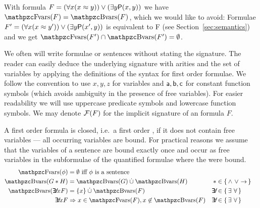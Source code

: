 \begin{example}
	With formula \( F = (\forall x (x\approx y)) \lor (\exists y \mathsf{P}(x,y)) \)
	we have \( \fvar(F) = \bvar(F) \), which we would like to avoid:
	Formulae
	\( F' = (\forall x (x\approx y')) \lor (\exists y \mathsf{P}(x',y)) \)
	is equivalent to F (see Section~\vref{sec:semantics})
	and we get
	\( \fvar(F') \cap \bvar(F') = \emptyset \).
\end{example}

We often will write formulae or sentences
without stating the signature.
The reader can easily deduce the underlying  signature with arities
and the set of variables by applying the definitions of the syntax for first order formulae.
We follow the convention to use \( x,y,z \) for variables
and \( \mathsf{a},\mathsf{b},\mathsf{c} \) for constant function symbols
(which avoids ambiguity in the presence of free variables).
For easier readability we will use uppercase predicate symbols and lowercase function symbols.
We may denote \( \mathcal{F}(F) \) for the implicit signature of an formula \( F \).

\begin{definition}\label{def:fof:closed}\label{def:fof:sentence}
	A first order formula is closed, i.e.~a first order ,
	if it does not contain free variables --- all occurring variables are bound.
	For practical reasons we assume that the variables of a sentence
	are bound exactly once
	and occur as free variables
	in the subformulae of the quantified formulae where the were bound.
	\begin{align*}
		\fvar(\phi) &= \emptyset
		\text{ iff }\phi\text{ is a sentence}
		\\
		\bvar(G * H) &= \bvar(G)\disjointunion\bvar(H)
		&*& \in \{ \, {\land} \ {\lor} \ {\limp} \, \}
		\\
		\bvar(\quantify x F) &= \{x\}\disjointunion\bvar(F)
		&\quantify& \in \{ \, {\exists} \ {\forall} \, \}
		\\
		\quantify x F &\Rightarrow
		x\in\fvar(F), x\not\in\bvar(F)
		&\quantify& \in \{ \, {\exists} \ {\forall} \, \}
	\end{align*}
\end{definition}

